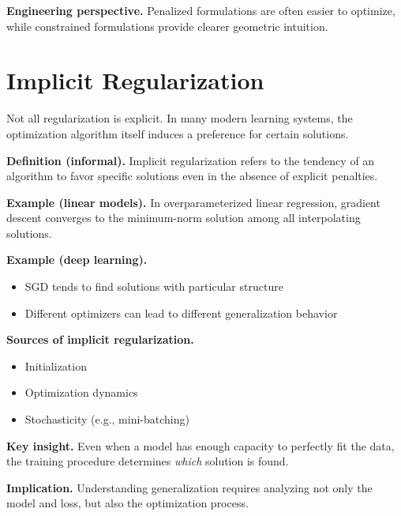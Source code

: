 \medskip

\noindent
\textbf{Engineering perspective.}  
Penalized formulations are often easier to optimize, while constrained formulations provide clearer geometric intuition.

\section{Implicit Regularization}

Not all regularization is explicit. In many modern learning systems, the optimization algorithm itself induces a preference for certain solutions.

\medskip

\noindent
\textbf{Definition (informal).}  
Implicit regularization refers to the tendency of an algorithm to favor specific solutions even in the absence of explicit penalties.

\medskip

\noindent
\textbf{Example (linear models).}  
In overparameterized linear regression, gradient descent converges to the minimum-norm solution among all interpolating solutions.

\medskip

\noindent
\textbf{Example (deep learning).}
\begin{itemize}
    \item SGD tends to find solutions with particular structure
    \item Different optimizers can lead to different generalization behavior
\end{itemize}

\medskip

\noindent
\textbf{Sources of implicit regularization.}
\begin{itemize}
    \item Initialization
    \item Optimization dynamics
    \item Stochasticity (e.g., mini-batching)
\end{itemize}

\medskip

\noindent
\textbf{Key insight.}  
Even when a model has enough capacity to perfectly fit the data, the training procedure determines \emph{which} solution is found.

\medskip

\noindent
\textbf{Implication.}  
Understanding generalization requires analyzing not only the model and loss, but also the optimization process.

